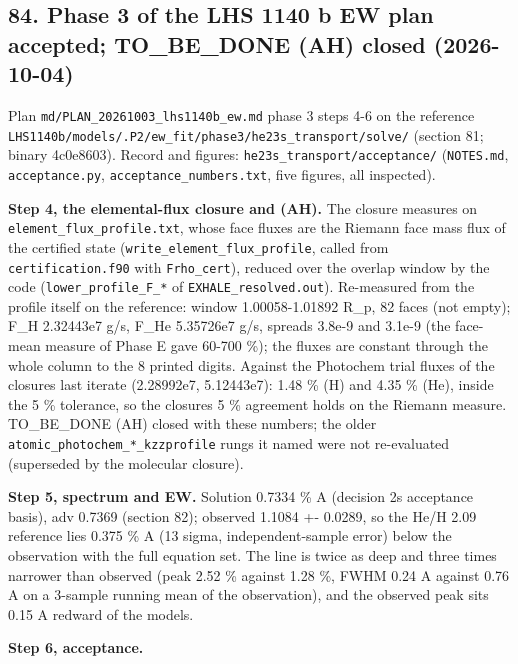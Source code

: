 \documentclass[english,a4paper]{my_memo}
\begin{document}
\subsection{84. Phase 3 of the LHS 1140 b EW plan accepted; TO\_BE\_DONE (AH) closed (2026-10-04)}\label{84-phase-3-of-the-lhs-1140-b-ew-plan-accepted-to_be_done-ah-closed-2026-10-04}

Plan \texttt{md/PLAN\_20261003\_lhs1140b\_ew.md} phase 3 steps 4-6 on the reference
\texttt{LHS1140b/models/.P2/ew\_fit/phase3/he23s\_transport/solve/} (section 81;
binary 4c0e8603). Record and figures:
\texttt{he23s\_transport/acceptance/} (\texttt{NOTES.md}, \texttt{acceptance.py},
\texttt{acceptance\_numbers.txt}, five figures, all inspected).

\textbf{Step 4, the elemental-flux closure and (AH).} The closure measures on
\texttt{element\_flux\_profile.txt}, whose face fluxes are the Riemann face mass
flux of the certified state (\texttt{write\_element\_flux\_profile}, called from
\texttt{certification.f90} with \texttt{Frho\_cert}), reduced over the overlap window by
the code (\texttt{lower\_profile\_F\_*} of \texttt{EXHALE\_resolved.out}). Re-measured from
the profile itself on the reference: window 1.00058-1.01892 R\_p, 82 faces
(not empty); F\_H 2.32443e7 g/s, F\_He 5.35726e7 g/s, spreads 3.8e-9 and
3.1e-9 (the face-mean measure of Phase E gave 60-700 \%); the fluxes are
constant through the whole column to the 8 printed digits. Against the
Photochem trial fluxes of the closure\textquotesingle s last iterate (2.28992e7,
5.12443e7): 1.48 \% (H) and 4.35 \% (He), inside the 5 \% tolerance, so the
closure\textquotesingle s 5 \% agreement holds on the Riemann measure. TO\_BE\_DONE (AH)
closed with these numbers; the older \texttt{atomic\_photochem\_*\_kzzprofile} rungs
it named were not re-evaluated (superseded by the molecular closure).

\textbf{Step 5, spectrum and EW.} Solution 0.7334 \% A (decision 2\textquotesingle s acceptance
basis), adv 0.7369 (section 82); observed 1.1084 +- 0.0289, so the He/H 2.09
reference lies 0.375 \% A (13 sigma, independent-sample error) below the
observation with the full equation set. The line is twice as deep and three
times narrower than observed (peak 2.52 \% against 1.28 \%, FWHM 0.24 A
against 0.76 A on a 3-sample running mean of the observation), and the
observed peak sits 0.15 A redward of the model\textquotesingle s.

\textbf{Step 6, acceptance.}
\end{document}
